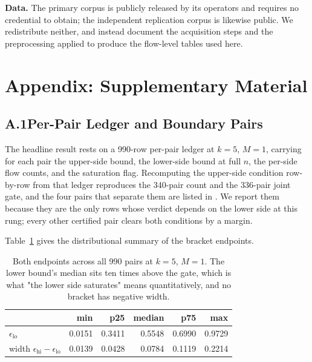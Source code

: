 \documentclass[letterpaper,twocolumn,10pt]{article}
\newcommand{\epslo}{\ensuremath{\epsilon_{\mathrm{lo}}}}
\newcommand{\epshi}{\ensuremath{\epsilon_{\mathrm{hi}}}}
\begin{document}
\textbf{Data.}
The primary corpus is publicly released by its operators and requires no
credential to obtain; the independent replication corpus is likewise public. We
redistribute neither, and instead document the acquisition steps and the
preprocessing applied to produce the flow-level tables used here.

\clearpage
\section*{Appendix: Supplementary Material}

\subsection*{A.1\quad Per-Pair Ledger and Boundary Pairs}

The headline result rests on a 990-row per-pair ledger at $k{=}5$, $M{=}1$,
carrying for each pair the upper-side bound, the lower-side bound at full $n$,
the per-side flow counts, and the saturation flag. Recomputing the upper-side
condition row-by-row from that ledger reproduces the 340-pair count and the
336-pair joint gate, and the four pairs that separate them are listed in
. We report them because they are the only rows whose verdict
depends on the lower side at this rung; every other certified pair clears both
conditions by a margin.



\label{sec:appendix/context}
\label{sec:appendix/endpoints}

Table~\ref{tab:endpoints} gives the distributional summary of the bracket
endpoints.

\begin{table}[!htbp]
\centering
\small
\caption{Both endpoints across all 990 pairs at $k{=}5$, $M{=}1$. The lower
bound's median sits ten times above the gate, which is what "the lower side
saturates" means quantitatively, and no bracket has negative width.}
\label{tab:endpoints}
\begin{tabular}{lrrrrr}
\toprule
 & min & p25 & median & p75 & max \\
\midrule
$\epslo$ & 0.0151 & 0.3411 & 0.5548 & 0.6990 & 0.9729 \\
width $\epshi-\epslo$ & 0.0139 & 0.0428 & 0.0784 & 0.1119 & 0.2214 \\
\bottomrule
\end{tabular}
\end{table}
\end{document}
